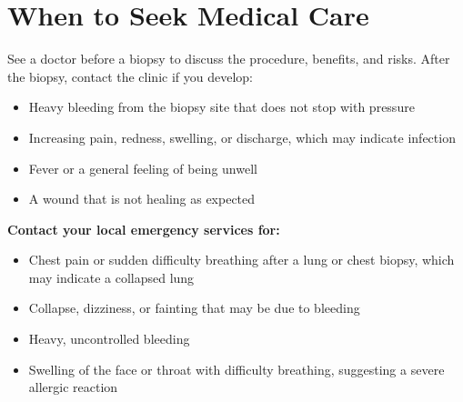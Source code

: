 \section*{When to Seek Medical Care}
See a doctor before a biopsy to discuss the procedure, benefits, and risks. After the biopsy, contact the clinic if you develop:

\begin{itemize}
    \item Heavy bleeding from the biopsy site that does not stop with pressure
    \item Increasing pain, redness, swelling, or discharge, which may indicate infection
    \item Fever or a general feeling of being unwell
    \item A wound that is not healing as expected
\end{itemize}

\textbf{Contact your local emergency services for:}
\begin{itemize}
    \item Chest pain or sudden difficulty breathing after a lung or chest biopsy, which may indicate a collapsed lung
    \item Collapse, dizziness, or fainting that may be due to bleeding
    \item Heavy, uncontrolled bleeding
    \item Swelling of the face or throat with difficulty breathing, suggesting a severe allergic reaction
\end{itemize}

